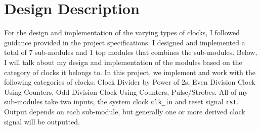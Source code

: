 \documentclass{article}
\begin{document}
\section{Design Description}
For the design and implementation of the varying types of clocks, I followed guidance provided in the project specifications. I designed and implemented a total of 7 sub-modules and 1 top modules that combines the sub-modules. Below, I will talk about my design and implementation of the modules based on the category of clocks it belongs to. In this project, we implement and work with the following categories of clocks: Clock Divider by Power of 2s, Even Division Clock Using Counters, Odd Division Clock Using Counters, Pulse/Strobes. All of my sub-modules take two inputs, the system clock \texttt{clk\_in} and reset signal \texttt{rst}. Output depends on each sub-module, but generally one or more derived clock signal will be outputted.
\renewcommand{\theenumi}{\alph{enumi}}
\end{document}
